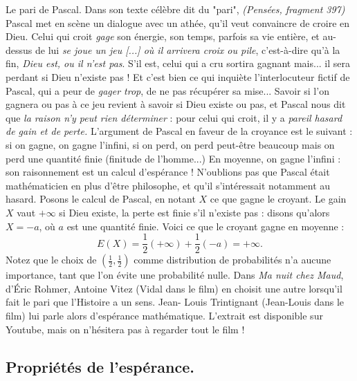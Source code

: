 \documentclass[11pt]{article}
\begin{document}
\begin{ex}{Le pari de Pascal.}{}
    Dans son texte célèbre dit du "pari", \emph{(Pensées, fragment 397)} Pascal met en scène un dialogue
    avec un athée, qu'il veut convaincre de croire en Dieu. Celui qui croit \emph{gage} son énergie, son
    temps, parfois sa vie entière, et au-dessus de lui \emph{se joue un jeu [...] où il arrivera croix ou pile},
    c'est-à-dire qu'à la fin, \emph{Dieu est, ou il n'est pas}. S'il est, celui qui a cru sortira gagnant mais... il
    sera perdant si Dieu n'existe pas ! Et c'est bien ce qui inquiète l'interlocuteur fictif de Pascal, qui
    a peur de \emph{gager trop}, de ne pas récupérer sa mise... Savoir si l'on gagnera ou pas à ce jeu revient
    à savoir si Dieu existe ou pas, et Pascal nous dit que \emph{la raison n'y peut rien déterminer} : pour
    celui qui croit, il y a \emph{pareil hasard de gain et de perte.}\n
    L'argument de Pascal en faveur de la croyance est le suivant : si on gagne, on gagne l'infini, si
    on perd, on perd peut-être beaucoup mais on perd une quantité finie (finitude de l'homme...) En
    moyenne, on gagne l'infini : son raisonnement est un calcul d'espérance ! N'oublions pas que Pascal
    était mathématicien en plus d'être philosophe, et qu'il s'intéressait notamment au hasard.
    Posons le calcul de Pascal, en notant $X$ ce que gagne le croyant. Le gain $X$ vaut $+\infty$ si Dieu
    existe, la perte est finie s'il n'existe pas : disons qu'alors $X = -a$, où $a$ est une quantité finie.
    Voici ce que le croyant gagne en moyenne :
    \begin{equation*}
        E(X)=\frac{1}{2}(+\infty)+\frac{1}{2}(-a)=+\infty.
    \end{equation*}
    Notez que le choix de $(\frac{1}{2},\frac{1}{2})$ comme distribution de probabilités n'a aucune importance, tant
    que l'on évite une probabilité nulle. Dans \emph{Ma nuit chez Maud}, d'Éric Rohmer, Antoine Vitez
    (Vidal dans le film) en choisit une autre lorsqu'il fait le pari que l'Histoire a un sens. Jean-
    Louis Trintignant (Jean-Louis dans le film) lui parle alors d'espérance mathématique. L'extrait
    est disponible sur Youtube, mais on n'hésitera pas à regarder tout le film !
\end{ex}

\subsection{Propriétés de l'espérance.}
\end{document}
